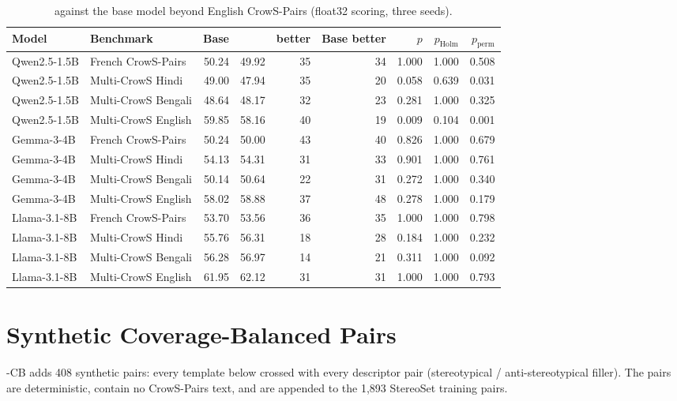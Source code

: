 \begin{table}[h]
  \centering
  \caption{\PEAT{} against the base model beyond English CrowS-Pairs (float32 scoring, three seeds).}
  \label{sup:tab:multi}
  \footnotesize\setlength{\tabcolsep}{4pt}
  \begin{tabular}{@{}llrrrrrrr@{}}
    \toprule
    Model & Benchmark & Base & \PEAT{} & \PEAT{} better & Base better & $p$ & $p_{\mathrm{Holm}}$ & $p_{\mathrm{perm}}$ \\
    \midrule
    Qwen2.5-1.5B & French CrowS-Pairs & 50.24 & 49.92 & 35 & 34 & 1.000 & 1.000 & 0.508 \\
    Qwen2.5-1.5B & Multi-CrowS Hindi & 49.00 & 47.94 & 35 & 20 & 0.058 & 0.639 & 0.031 \\
    Qwen2.5-1.5B & Multi-CrowS Bengali & 48.64 & 48.17 & 32 & 23 & 0.281 & 1.000 & 0.325 \\
    Qwen2.5-1.5B & Multi-CrowS English & 59.85 & 58.16 & 40 & 19 & 0.009 & 0.104 & 0.001 \\
    Gemma-3-4B & French CrowS-Pairs & 50.24 & 50.00 & 43 & 40 & 0.826 & 1.000 & 0.679 \\
    Gemma-3-4B & Multi-CrowS Hindi & 54.13 & 54.31 & 31 & 33 & 0.901 & 1.000 & 0.761 \\
    Gemma-3-4B & Multi-CrowS Bengali & 50.14 & 50.64 & 22 & 31 & 0.272 & 1.000 & 0.340 \\
    Gemma-3-4B & Multi-CrowS English & 58.02 & 58.88 & 37 & 48 & 0.278 & 1.000 & 0.179 \\
    Llama-3.1-8B & French CrowS-Pairs & 53.70 & 53.56 & 36 & 35 & 1.000 & 1.000 & 0.798 \\
    Llama-3.1-8B & Multi-CrowS Hindi & 55.76 & 56.31 & 18 & 28 & 0.184 & 1.000 & 0.232 \\
    Llama-3.1-8B & Multi-CrowS Bengali & 56.28 & 56.97 & 14 & 21 & 0.311 & 1.000 & 0.092 \\
    Llama-3.1-8B & Multi-CrowS English & 61.95 & 62.12 & 31 & 31 & 1.000 & 1.000 & 0.793 \\
    \bottomrule
  \end{tabular}
\end{table}

\section{Synthetic Coverage-Balanced Pairs}
\label{sup:cb}

\PEAT{}-CB adds 408 synthetic pairs: every template below crossed with every descriptor pair
(stereotypical / anti-stereotypical filler).
The pairs are deterministic, contain no CrowS-Pairs text, and are appended to the 1{,}893 StereoSet
training pairs.

